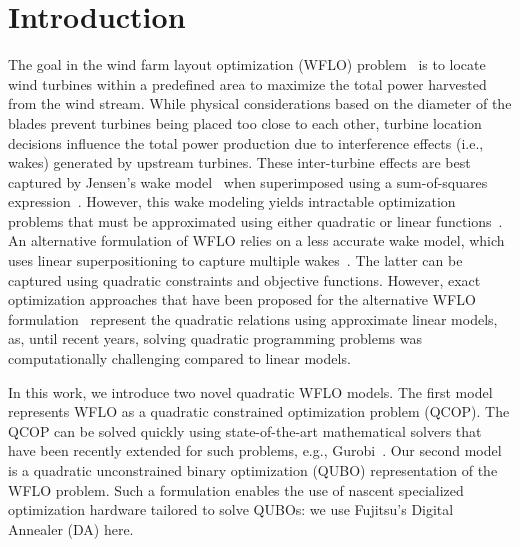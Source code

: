 \documentclass[preprint,12pt]{elsarticle}
\begin{document}
\maketitle 

\section{Introduction}
The goal in the wind farm layout optimization (WFLO)
problem~\cite{MOSETTI1994105} is to locate wind turbines within a
predefined area to maximize the total power harvested from the wind
stream.  While physical considerations based on the diameter of the
blades prevent turbines being placed too close to each other, turbine
location decisions influence the total power production due to
interference effects (i.e., wakes) generated by upstream turbines.
These inter-turbine effects are best captured by Jensen's wake model~\cite{jensen1983note} when superimposed
using a sum-of-squares expression~\cite{Zhang2014}. However,
this wake modeling yields intractable optimization problems
that must be approximated using either quadratic or linear functions~\cite{turner2014new}.
An alternative formulation of WFLO relies on a less accurate wake model, which uses linear superpositioning
to capture multiple wakes~\cite{donovan2005wind}.
The latter can be captured using quadratic
constraints and objective functions. However, exact optimization
approaches that have been proposed for the alternative WFLO formulation~\cite{Zhang2014,kuo2016wind,donovan2005wind,fagerfjall2010optimizing,archer2011wind,sorkhabi2018constrained}
represent the quadratic relations using approximate linear models,
as, until recent years, solving quadratic programming problems
was computationally challenging compared to linear models.

In this work, we introduce two novel quadratic WFLO models. The first
model represents WFLO as a quadratic constrained optimization
problem (QCOP).  The QCOP can be solved quickly using state-of-the-art mathematical solvers
that have been recently extended for such problems, e.g., Gurobi~\cite{gurobi}.  Our
second model is a quadratic unconstrained binary optimization
(QUBO) representation of the WFLO problem.  Such a formulation enables the use of
nascent specialized optimization hardware tailored to solve QUBOs: we use Fujitsu's Digital Annealer (DA) \cite{aramon2019physics} here.
\end{document}
